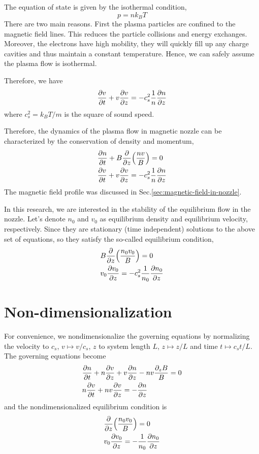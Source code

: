 The equation of state is given by the isothermal condition,
\begin{equation} \label{eq:eos}
    p = nk_BT
\end{equation}
There are two main reasons. First the plasma particles are confined to the magnetic field lines. This reduces the particle collisions and energy exchanges. Moreover, the electrons have high mobility, they will quickly fill up any charge cavities and thus maintain a constant temperature. Hence, we can safely assume the plasma flow is isothermal.

Therefore, we have
\begin{equation}
    \pdv{v}{t} + v\pdv{v}{z} = -c_s^2\frac{1}{n}\pdv{n}{z}
\end{equation}
where $c_s^2 = k_BT/m$ is the square of sound speed.

Therefore, the dynamics of the plasma flow in magnetic nozzle can be characterized by the conservation of density and momentum,
\begin{align*}
     & \pdv{n}{t} + B\pdv{z}(\frac{nv}{B}) = 0                \\
     & \pdv{v}{t} + v\pdv{v}{z} = -c_s^2\frac{1}{n}\pdv{n}{z}
\end{align*}
The magnetic field profile was discussed in Sec.\ref{sec:magnetic-field-in-nozzle}.

In this research, we are interested in the stability of the equilibrium flow in the nozzle. Let's denote $n_0$ and $v_0$ as equilibrium density and equilibrium velocity, respectively. Since they are stationary (time independent) solutions to the above set of equations, so they satisfy the so-called equilibrium condition,
\begin{align*}
     & B\pdv{z}(\frac{n_0v_0}{B})  = 0                   \\
     & v_0\pdv{v_0}{z} = -c_s^2\frac{1}{n_0}\pdv{n_0}{z}
\end{align*}

\section{Non-dimensionalization}
For convenience, we nondimensionalize the governing equations by normalizing the velocity to $c_s$, $v\mapsto v/c_s$, $z$ to system length $L$, $z \mapsto z/L$ and time $t\mapsto c_s t/L$. The governing equations become
\begin{align}
     & \pdv{n}{t} + n\pdv{v}{z} + v\pdv{n}{z} - nv\frac{\partial_z B}{B} = 0
    \label{eq:conservation-of-density}
    \\
     & n\pdv{v}{t} + nv\pdv{v}{z} = -\pdv{n}{z}
    \label{eq:conservation-of-momentum}
\end{align}
and the nondimensionalized equilibrium condition is
\begin{align}
     & \pdv{z}(\frac{n_0v_0}{B}) = 0 \label{eq:equilibrium-convervation-of-mass}                    \\
     & v_0\pdv{v_0}{z} = -\frac{1}{n_0}\pdv{n_0}{z} \label{eq:equilibrium-convervation-of-momentum}
\end{align}

